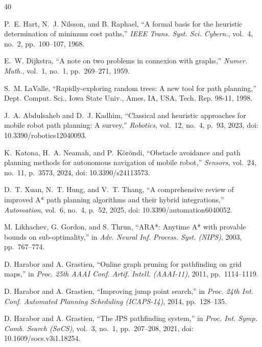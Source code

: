 \begin{thebibliography}{40}

P.~E. Hart, N.~J. Nilsson, and B. Raphael, ``A formal basis for the heuristic determination of minimum cost paths,'' \textit{IEEE Trans. Syst. Sci. Cybern.}, vol.~4, no.~2, pp.~100--107, 1968.



E.~W. Dijkstra, ``A note on two problems in connexion with graphs,'' \textit{Numer. Math.}, vol.~1, no.~1, pp.~269--271, 1959.



S.~M. LaValle, ``Rapidly-exploring random trees: A new tool for path planning,'' Dept. Comput. Sci., Iowa State Univ., Ames, IA, USA, Tech. Rep. 98-11, 1998.



J.~A. Abdulsaheb and D.~J. Kadhim, ``Classical and heuristic approaches for mobile robot path planning: A survey,'' \textit{Robotics}, vol.~12, no.~4, p.~93, 2023, doi: 10.3390/robotics12040093.



K.~Katona, H.~A. Neamah, and P.~K\"or\"ondi, ``Obstacle avoidance and path planning methods for autonomous navigation of mobile robot,'' \textit{Sensors}, vol.~24, no.~11, p.~3573, 2024, doi: 10.3390/s24113573.



D.~T. Xuan, N.~T. Hung, and V.~T. Thang, ``A comprehensive review of improved A* path planning algorithms and their hybrid integrations,'' \textit{Automation}, vol.~6, no.~4, p.~52, 2025, doi: 10.3390/automation6040052.



M. Likhachev, G. Gordon, and S. Thrun, ``ARA*: Anytime A* with provable bounds on sub-optimality,'' in \textit{Adv. Neural Inf. Process. Syst. (NIPS)}, 2003, pp.~767--774.



D. Harabor and A. Grastien, ``Online graph pruning for pathfinding on grid maps,'' in \textit{Proc. 25th AAAI Conf. Artif. Intell. (AAAI-11)}, 2011, pp.~1114--1119.



D. Harabor and A. Grastien, ``Improving jump point search,'' in \textit{Proc. 24th Int. Conf. Automated Planning Scheduling (ICAPS-14)}, 2014, pp.~128--135.



D. Harabor and A. Grastien, ``The JPS pathfinding system,'' in \textit{Proc. Int. Symp. Comb. Search (SoCS)}, vol.~3, no.~1, pp.~207--208, 2021, doi: 10.1609/socs.v3i1.18254.



\end{thebibliography}
